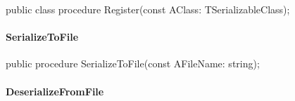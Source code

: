 \documentclass{report}
\newif\ifpdf
\begin{document}
\label{PasDoc_Serialize.TSerializable-Register}
\begin{list}{}{
\setlength{\itemindent}{0cm}
\setlength{\listparindent}{0cm}
\setlength{\leftmargin}{\evensidemargin}
\addtolength{\leftmargin}{\tmplength}
\settowidth{\labelsep}{X}
\addtolength{\leftmargin}{\labelsep}
\setlength{\labelwidth}{\tmplength}
}
\item[\textbf{Declaration}\hfill]
\ifpdf
\begin{flushleft}
\fi
\begin{ttfamily}
public class procedure Register(const AClass: TSerializableClass);\end{ttfamily}

\ifpdf
\end{flushleft}
\fi

\end{list}
\paragraph*{SerializeToFile}\hspace*{\fill}

\label{PasDoc_Serialize.TSerializable-SerializeToFile}
\begin{list}{}{
\setlength{\itemindent}{0cm}
\setlength{\listparindent}{0cm}
\setlength{\leftmargin}{\evensidemargin}
\addtolength{\leftmargin}{\tmplength}
\settowidth{\labelsep}{X}
\addtolength{\leftmargin}{\labelsep}
\setlength{\labelwidth}{\tmplength}
}
\item[\textbf{Declaration}\hfill]
\ifpdf
\begin{flushleft}
\fi
\begin{ttfamily}
public procedure SerializeToFile(const AFileName: string);\end{ttfamily}

\ifpdf
\end{flushleft}
\fi

\end{list}
\paragraph*{DeserializeFromFile}\hspace*{\fill}
\end{document}
